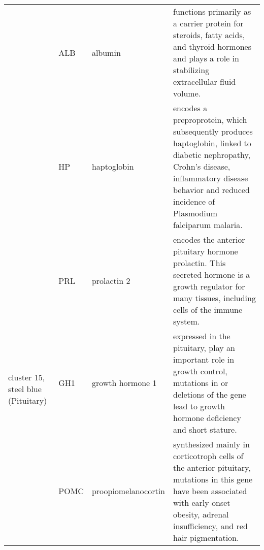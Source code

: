 \begin{table}
\begin{center}
\begin{tabular}{|p{0.7in} |p{0.5in}|p{1.4in}|p{3.6in}|}
 					      &  \small{ALB} & \footnotesize{albumin} & \scriptsize{functions primarily as a carrier protein for steroids, fatty acids, and thyroid hormones and plays a role in stabilizing extracellular fluid volume.} \\
					      &  \small{HP} & \footnotesize{haptoglobin} & \scriptsize{encodes a preproprotein, which subsequently  produces haptoglobin, linked to diabetic nephropathy, Crohn's disease, inflammatory disease behavior and reduced incidence of Plasmodium falciparum malaria.}\\
\hline					      
 \multirow{3}{4em}{\small{cluster 15, steel blue (Pituitary)}}&  \small{PRL} & \footnotesize{prolactin 2} & \scriptsize{encodes the anterior pituitary hormone prolactin. This secreted hormone is a growth regulator for many tissues, including cells of the immune system.} \\
 					      &  \small{GH1} & \footnotesize{growth hormone 1} & \scriptsize{expressed in the pituitary, play an important role in growth control, mutations in or deletions of the gene lead to growth hormone deficiency and short stature.}\\
					      &  \small{POMC} & \footnotesize{proopiomelanocortin} & \scriptsize{synthesized mainly in corticotroph cells of the anterior pituitary, mutations in this gene have been associated with early onset obesity, adrenal insufficiency, and red hair pigmentation.} \\
\hline
 \end{tabular}
 \end{center}
\end{table}

\clearpage


